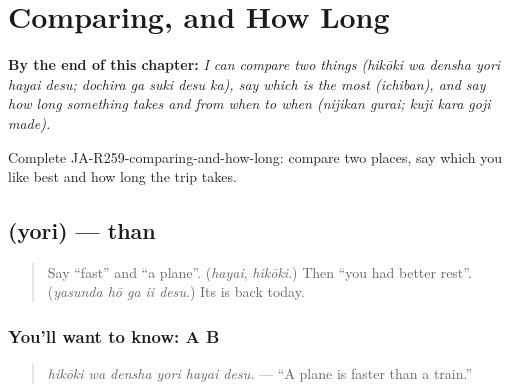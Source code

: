 
\chapter{Comparing, and How Long}
\label{ch:ja-comparing-and-how-long}

\begin{chapteropening}
\textbf{By the end of this chapter:} \emph{I can compare two things (hikōki wa densha yori hayai desu; dochira ga suki desu ka), say which is the most (ichiban), and say how long something takes and from when to when (nijikan gurai; kuji kara goji made).}

Complete JA-R259-comparing-and-how-long: compare two places, say which you like best and how long the trip takes.
\end{chapteropening}

\section[\texorpdfstring{\ja{より} (yori)}{より (yori)}]{ (yori) — than}

\label{lesson:JA-C259-yori}



\begin{quote}
Say \textquotedblleft{}fast\textquotedblright{} and \textquotedblleft{}a plane\textquotedblright{}. (\emph{hayai}, \emph{hikōki}.) Then \textquotedblleft{}you had better rest\textquotedblright{}. (\emph{yasunda hō ga ii desu}.) Its \textbf{} is back today.
\end{quote}

\subsection*{You'll want to know: A  B }
\begin{quote}
\textbf{  }
\end{quote}

\begin{quote}
\emph{hikōki wa densha yori hayai desu.} — \textquotedblleft{}A plane is faster than a train.\textquotedblright{}
\end{quote}


